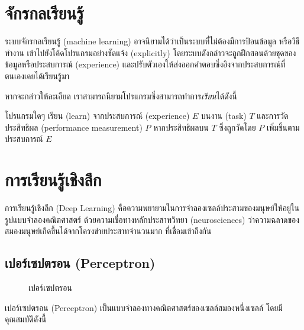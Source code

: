 \documentclass{cpereport}
\begin{document}
\section{จักรกลเรียนรู้}
ระบบจักรกลเรียนรู้ (machine learning) อาจนิยามได้ว่าเป็นระบบที่ไม่ต้องมีการป้อนข้อมูล หรือวิธีทำงาน เข้าไปยังโค้ดโปรแกรมอย่างชัดแจ้ง (explicitly) โดยระบบดังกล่าวจะถูกฝึกสอนด้วยชุดของข้อมูลหรือประสบการณ์ (experience) และปรับตัวเองให้ส่งออกคำตอบซึ่งอิงจากประสบการณ์ที่ตนเองเคยได้เรียนรู้มา

หากจะกล่าวให้ละเอียด เราสามารถนิยามโปรแกรมซึ่งสามารถทำการ\textit{เรียน}ได้ดังนี้ \cite{Mitchell97}

\begin{definition}
โปรแกรมใดๆ เรียน (learn) จากประสบการณ์ (experience) $E$ บนงาน (task) $T$ และการวัดประสิทธิผล (performance measurement) $P$ หากประสิทธิผลบน $T$ ซึ่งถูกวัดโดย $P$ เพิ่มขึ้นตามประสบการณ์ $E$
\end{definition}

\section{การเรียนรู้เชิงลึก}
การเรียนรู้เชิงลึก (Deep Learning) คือความพยายามในการจำลองเซลล์ประสามของมนุษย์ให้อยู่ในรูปแบบจำลองคณิตศาสตร์
ด้วยความเชื่อทางหลักประสาทวิทยา (neurosciences) ว่าความฉลาดของสมองมนุษย์เกิดขึ้นได้จากโครงข่ายประสาทจำนวนมาก
ที่เชื่อมเข้าถึงกัน \cite{Goodfellow-et-al-2016}

\subsection{เปอร์เซปตรอน (Perceptron)}
\begin{figure}
    \centering
    \caption{เปอร์เซปตรอน}
    \label{tikz-perceptron}
\end{figure}
เปอร์เซปตรอน (Perceptron) \cite{rosenblatt_1958} เป็นแบบจำลองทางคณิตศาสตร์ของเซลล์สมองหนึ่งเซลล์ โดยมีคุณสมบัติดังนี้
\end{document}

